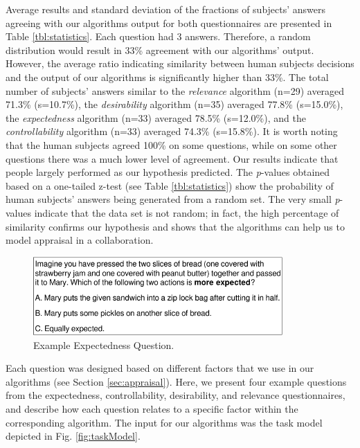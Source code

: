 \documentclass[12pt]{report}
\begin{document}
Average results and standard deviation of the fractions of subjects' answers
agreeing with our algorithms output for both questionnaires are presented in
Table \ref{tbl:statistics}. Each question had 3 answers. Therefore, a random
distribution would result in 33\% agreement with our algorithms' output.
However, the average ratio indicating similarity between human subjects
decisions and the output of our algorithms is significantly higher than 33\%.
The total number of subjects' answers similar to the \textit{relevance}
algorithm (n=29) averaged 71.3\% (s=10.7\%), the \textit{desirability}
algorithm (n=35) averaged 77.8\% (s=15.0\%), the \textit{expectedness}
algorithm (n=33) averaged 78.5\% (s=12.0\%), and the \textit{controllability}
algorithm (n=33) averaged 74.3\% (s=15.8\%). It is worth noting that the human
subjects agreed 100\% on some questions, while on some other questions there
was a much lower level of agreement. Our results indicate that people largely
performed as our hypothesis predicted. The \textit{p}-values obtained based on a
one-tailed z-test (see Table \ref{tbl:statistics}) show the probability of human
subjects' answers being generated from a random set. The very small
\textit{p}-values indicate that the data set is not random; in fact, the high
percentage of similarity confirms our hypothesis and shows that the algorithms
can help us to model appraisal in a collaboration.

\begin{figure}[tbh]
  \centering
  \includegraphics[width=0.85\textwidth]{figure/question-sample-croped.pdf}
  \caption{{\fontsize{9}{9}\selectfont Example Expectedness Question.}}
  \label{fig:qs1}
  \vspace{-5mm}
\end{figure}

Each question was designed based on different factors that we use in our
algorithms (see Section \ref{sec:appraisal}). Here, we present four example
questions from the expectedness, controllability, desirability, and relevance
questionnaires, and describe how each question relates to a specific factor
within the corresponding algorithm. The input for our algorithms was the task
model depicted in Fig. \ref{fig:taskModel}.
\end{document}
